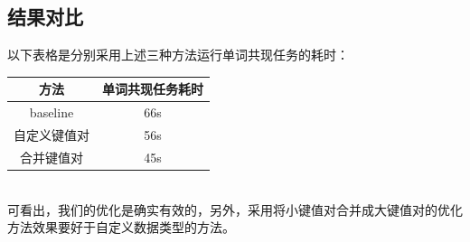 \subsection{结果对比}
以下表格是分别采用上述三种方法运行单词共现任务的耗时：
\begin{table}[htbp]
	\begin{center}
		\begin{tabular}{|c|c|}
			\hline
			\textbf{方法} & \textbf{单词共现任务耗时} \\ \hline
			baseline    & 66s               \\ \hline
			自定义键值对      & 56s               \\ \hline
			合并键值对       & 45s               \\ \hline
		\end{tabular}
	\end{center}
\end{table}\\
\indent 可看出，我们的优化是确实有效的，另外，采用将小键值对合并成大键值对的优化方法效果要好于自定义数据类型的方法。